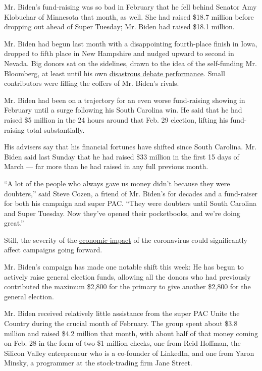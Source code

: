 Mr. Biden's fund-raising was so bad in February that he fell behind
Senator Amy Klobuchar of Minnesota that month, as well. She had raised
\$18.7 million before dropping out ahead of Super Tuesday; Mr. Biden had
raised \$18.1 million.

Mr. Biden had begun last month with a disappointing fourth-place finish
in Iowa, dropped to fifth place in New Hampshire and nudged upward to
second in Nevada. Big donors sat on the sidelines, drawn to the idea of
the self-funding Mr. Bloomberg, at least until his own
\href{https://www.nytimes3xbfgragh.onion/2020/02/20/us/politics/bloomberg-nevada-debate.html}{disastrous
debate performance}. Small contributors were filling the coffers of Mr.
Biden's rivals.

Mr. Biden had been on a trajectory for an even worse fund-raising
showing in February until a surge following his South Carolina win. He
said that he had raised \$5 million in the 24 hours around that Feb. 29
election, lifting his fund-raising total substantially.

His advisers say that his financial fortunes have shifted since South
Carolina. Mr. Biden said last Sunday that he had raised \$33 million in
the first 15 days of March --- far more than he had raised in any full
previous month.

``A lot of the people who always gave us money didn't because they were
doubters,'' said Steve Cozen, a friend of Mr. Biden's for decades and a
fund-raiser for both his campaign and super PAC. ``They were doubters
until South Carolina and Super Tuesday. Now they've opened their
pocketbooks, and we're doing great.''

Still, the severity of the
\href{https://www.nytimes3xbfgragh.onion/2020/03/21/business/economy/coronavirus-recession.html}{economic
impact} of the coronavirus could significantly affect campaigns going
forward.

Mr. Biden's campaign has made one notable shift this week: He has begun
to actively raise general election funds, allowing all the donors who
had previously contributed the maximum \$2,800 for the primary to give
another \$2,800 for the general election.

Mr. Biden received relatively little assistance from the super PAC Unite
the Country during the crucial month of February. The group spent about
\$3.8 million and raised \$4.2 million that month, with about half of
that money coming on Feb. 28 in the form of two \$1 million checks, one
from Reid Hoffman, the Silicon Valley entrepreneur who is a co-founder
of LinkedIn, and one from Yaron Minsky, a programmer at the
stock-trading firm Jane Street.

